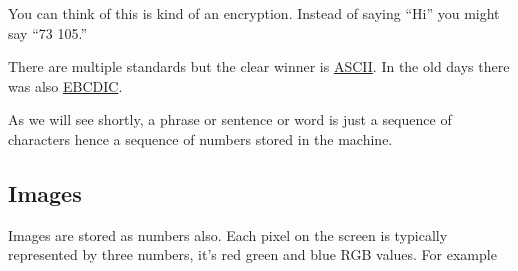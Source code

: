 \begin{fullwidth}
You can think of this is kind of an encryption. Instead of saying ``Hi'' you might say ``73 105.''
 
There are multiple standards but the clear winner is \href{http://www.asciitable.com/}{ASCII}. In the old days there was also \href{http://www.lookuptables.com/ebcdic_scancodes.php}{EBCDIC}.


As we will see shortly, a phrase or sentence or word is just a sequence of characters hence a sequence of numbers stored in the machine.

\subsection{Images}

Images are stored as numbers also. Each pixel on the screen is typically represented by three numbers, it's red green and blue RGB values. For example 


\end{fullwidth}
